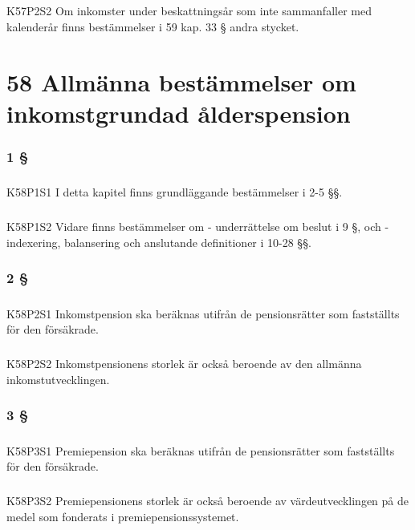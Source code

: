 \documentclass[a4paper,notitlepage,openany,10pt]{book}
\begin{document}
\paragraph*{}
{\tiny K57P2S2}
Om inkomster under beskattningsår som inte sammanfaller med kalenderår finns bestämmelser i 59 kap. 33 § andra stycket.
\chapter*{58 Allmänna bestämmelser om inkomstgrundad ålderspension}
\subsection*{1 §}
\paragraph*{}
{\tiny K58P1S1}
I detta kapitel finns grundläggande bestämmelser i 2-5 §§.
\paragraph*{}
{\tiny K58P1S2}
Vidare finns bestämmelser om
\newline - underrättelse om beslut i 9 §, och
\newline - indexering, balansering och anslutande definitioner i 10-28 §§.
\subsection*{2 §}
\paragraph*{}
{\tiny K58P2S1}
Inkomstpension ska beräknas utifrån de pensionsrätter som fastställts för den försäkrade.
\paragraph*{}
{\tiny K58P2S2}
Inkomstpensionens storlek är också beroende av den allmänna inkomstutvecklingen.
\subsection*{3 §}
\paragraph*{}
{\tiny K58P3S1}
Premiepension ska beräknas utifrån de pensionsrätter som fastställts för den försäkrade.
\paragraph*{}
{\tiny K58P3S2}
Premiepensionens storlek är också beroende av värdeutvecklingen på de medel som fonderats i premiepensionssystemet.
\end{document}
